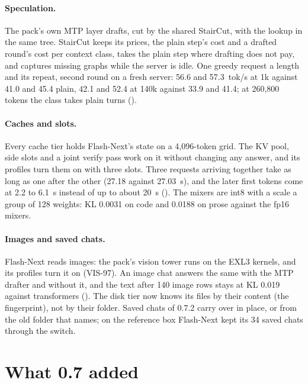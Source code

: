 \paragraph{Speculation.} The pack's own MTP layer drafts, cut by the shared StairCut, with the lookup in the same tree. StairCut keeps its prices, the plain step's cost and a drafted round's cost per context class, takes the plain step where drafting does not pay, and captures missing graphs while the server is idle. One greedy request a length and its repeat, second round on a fresh server: 56.6 and 57.3~tok/s at 1k against 41.0 and 45.4 plain, 42.1 and 52.4 at 140k against 33.9 and 41.4; at 260,800 tokens the class takes plain turns (\measured).

\paragraph{Caches and slots.} Every cache tier holds Flash-Next's state on a 4,096-token grid. The KV pool, side slots and a joint verify pass work on it without changing any answer, and its profiles turn them on with three slots. Three requests arriving together take as long as one after the other (27.18 against 27.03~s), and the later first tokens come at 2.2 to 6.1~s instead of up to about 20~s (\measured). The mixers are int8 with a scale a group of 128 weights: KL 0.0031 on code and 0.0188 on prose against the fp16 mixers.

\paragraph{Images and saved chats.} Flash-Next reads images: the pack's vision tower runs on the EXL3 kernels, and its profiles turn it on (VIS-97). An image chat answers the same with the MTP drafter and without it, and the text after 140 image rows stays at KL 0.019 against transformers (\measured). The disk tier now knows its files by their content (the  fingerprint), not by their folder. Saved chats of 0.7.2 carry over in place, or from the old folder that  names; on the reference box Flash-Next kept its 34 saved chats through the switch.

\section{What 0.7 added}

